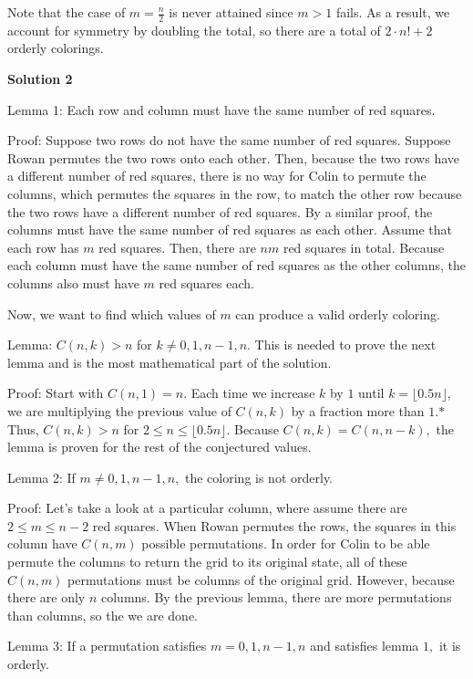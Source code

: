 \begin{enumerate}
 Note that the case of $m=\frac{n}{2}$ is never attained since $m>1$ fails. As a result, we account for symmetry by doubling the total, so there are a total of $\boxed{2\cdot n!+2}$ orderly colorings.

 



\textbf{Solution 2}

Lemma 1: Each row and column must have the same number of red squares.

 Proof: Suppose two rows do not have the same number of red squares. Suppose Rowan permutes the two rows onto each other. Then, because the two rows have a different number of red squares, there is no way for Colin to permute the columns, which permutes the squares in the row, to match the other row because the two rows have a different number of red squares. By a similar proof, the columns must have the same number of red squares as each other. Assume that each row has $m$ red squares. Then, there are $nm$ red squares in total. Because each column must have the same number of red squares as the other columns, the columns also must have $m$ red squares each.

 
Now, we want to find which values of $m$ can produce a valid orderly coloring.

 
Lemma: $C(n,k)>n$ for $k\neq 0,1,n-1,n.$ This is needed to prove the next lemma and is the most mathematical part of the solution.

 Proof: Start with $C(n,1)=n.$ Each time we increase $k$ by $1$ until $k=\lfloor0.5n\rfloor,$ we are multiplying the previous value of $C(n,k)$ by a fraction more than $1.\text{*}$ Thus, $C(n,k)>n$ for $2\le n \le \lfloor0.5n\rfloor.$ Because $C(n,k)=C(n,n-k),$ the lemma is proven for the rest of the conjectured values. 

 
Lemma 2: If $m\neq 0,1,n-1,n,$ the coloring is not orderly.

 Proof: Let's take a look at a particular column, where assume there are $2\le m\le n-2$ red squares. When Rowan permutes the rows, the squares in this column have $C(n,m)$ possible permutations. In order for Colin to be able permute the columns to return the grid to its original state, all of these $C(n,m)$ permutations must be columns of the original grid. However, because there are only $n$ columns. By the previous lemma, there are more permutations than columns, so the we are done.

 
Lemma 3: If a permutation satisfies $m=0,1,n-1,n$ and satisfies lemma $1,$ it is orderly.


\end{enumerate}
